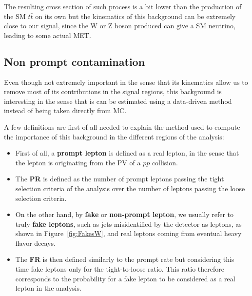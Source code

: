 \documentclass[a4paper, 10pt, openright]{report}
\begin{document}
The resulting cross section of such process is a bit lower than the production of the \ac{SM} $t \bar t$ on its own but the kinematics of this background can be extremely close to our signal, since the W or Z boson produced can give a \ac{SM} neutrino, leading to some actual \ac{MET}.

\subsection{Non prompt contamination} \label{subsection:Fakes}

Even though not extremely important in the sense that its kinematics allow us to remove most of its contributions in the signal regions, this background is interesting in the sense that is can be estimated using a data-driven method instead of being taken directly from \ac{MC}.

A few definitions are first of all needed to explain the method used to compute the importance of this background in the different regions of the analysis:
\begin{itemize}
\item First of all, a \textbf{prompt lepton} is defined as a real lepton, in the sense that the lepton is originating from the \ac{PV} of a $pp$ collision.
\item The \textbf{\ac{PR}} is defined as the number of prompt leptons passing the tight selection criteria of the analysis over the number of leptons passing the loose selection criteria. 
\item On the other hand, by \textbf{fake} or \textbf{non-prompt lepton}, we usually refer to truly \textbf{fake leptons}, such as jets misidentified by the detector as leptons, as shown in Figure~\ref{fig:FakesW}, and real leptons coming from eventual heavy flavor decays.
\item The \textbf{\ac{FR}} is then defined similarly to the prompt rate but considering this time fake leptons only for the tight-to-loose ratio. This ratio therefore corresponds to the probability for a fake lepton to be considered as a real lepton in the analysis.
\end{itemize}
\end{document}

